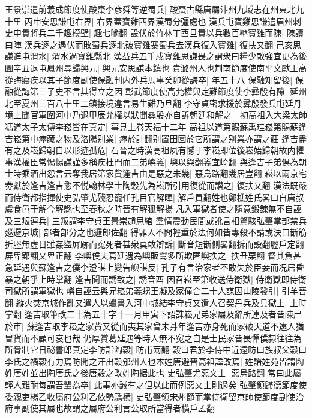 王景崇遣前義成節度使酸棗李彦舜等逆蜀兵|{
	酸棗古縣唐屬汴州九域志在州東北九十里}
丙申安思謙屯右界|{
	右界蓋寶雞西界漢蜀分彊處也}
漢兵屯寶雞思謙遣眉州刺史申貴將兵二千趣模壁|{
	趣七喻翻}
設伏於竹林丁酉旦貴以兵數百壓寶雞而陳|{
	陳讀曰陣}
漢兵逐之遇伏而敗蜀兵逐北破寶雞寨蜀兵去漢兵復入寶雞|{
	復扶又翻}
己亥思謙進屯渭水|{
	渭水過寶雞縣北}
漢益兵五千戍寶雞思謙畏之謂衆曰糧少敵強宜更為後圖辛丑退屯鳳州尋歸興元|{
	興元安思謙本鎮也}
貴潞州人也荆南節度使南平文獻王高從誨寢疾以其子節度副使保融判内外兵馬事癸卯從誨卒|{
	年五十八}
保融知留後|{
	保融從誨第三子史不言其得立之因}
彰武節度使高允權與定難節度使李彞殷有隙|{
	延州北至夏州三百八十里二鎮接境違言易生難乃旦翻}
李守貞密求援於彞殷發兵屯延丹境上聞官軍圍河中乃退甲辰允權以狀聞彞殷亦自訴朝廷和解之　初高祖入大梁太師馮道太子太傅李崧皆在真定|{
	事見上卷天福十二年}
高祖以道第賜蘇禹珪崧第賜蘇逢吉崧第中瘞藏之物及洛陽别業|{
	瘞於計翻别置田園於它所謂之别業亦謂之莊}
逢吉盡有之及崧歸朝自以形迹孤危|{
	石晉之時漢高祖夙有憾于李崧即位後崧始歸朝故内懼}
事漢權臣常惕惕謙謹多稱疾杜門而二弟嶼㠖|{
	嶼以與翻㠖宜崎翻}
與逢吉子弟俱為朝士時乘酒出怨言云奪我居第家貲逢吉由是惡之未幾|{
	惡烏路翻幾居豈翻}
崧以兩京宅劵獻於逢吉逢吉愈不悦翰林學士陶穀先為崧所引用復從而譛之|{
	復扶又翻}
漢法既嚴而侍衛都指揮使史弘肇尤殘忍寵任孔目官解暉|{
	解戶買翻姓也鄭樵姓氏畧曰自唐叔虞食邑于解今解縣也至春秋之時晉有解狐解揚}
凡入軍獄者使之隨意鍛鍊無不自誣及三叛連兵|{
	三叛謂李守貞王景崇趙思綰}
羣情震動民間或訛言相驚駭弘肇掌部禁兵廵邏京城|{
	部者部分之也邏郎佐翻}
得罪人不問輕重於法何如皆專殺不請或決口斮筋折脛無虚日雖姦盜屛跡而寃死者甚衆莫敢辯訴|{
	斷音短斮側畧翻拆而設翻脛戶定翻屏卑郢翻又卑正翻}
李嶼僕夫葛延遇為嶼販鬻多所欺匿嶼抶之|{
	抶丑栗翻}
督其負甚急延遇與蘇逢吉之僕李澄謀上變告嶼謀反|{
	孔子有言治家者不敢失於臣妾而况居昏暴之朝乎上時掌翻}
逢吉聞而誘致之|{
	誘音酉}
因召崧至第收送侍衛獄|{
	侍衛獄即侍衛司獄所謂軍獄也}
嶼自誣云與兄崧弟㠖甥王凝及家僮合二十人謀因山陵發引|{
	引羊晉翻}
縱火焚京城作亂又遣人以蠟書入河中城結李守貞又遣人召契丹兵及具獄上|{
	上時掌翻}
逢吉取筆改二十為五十字十一月甲寅下詔誅崧兄弟家屬及辭所連及者皆陳尸於市|{
	蘇逢吉取李崧之家貲又從而夷其家曾未朞年逢吉亦身死而家破天道不遠人猶冒貨而不顧可哀也哉}
仍厚賞葛延遇等時人無不寃之自是士民家皆畏憚僕隸往往為所脅制它日祕書郎真定李昉詣陶穀|{
	昉甫兩翻}
穀曰君於李侍中近遠昉曰族叔父穀曰李氏之禍穀有力焉昉聞之汗出穀邠州人也本姓唐避晉高祖諱改焉|{
	姓譜姓苑皆謂陶姓唐姓並出陶唐氏之後唐穀之改姓陶据此也}
史弘肇尤惡文士|{
	惡烏路翻}
常曰此屬輕人難耐每謂吾輩為卒|{
	此事亦誠有之但以此而例惡文士則過矣}
弘肇領歸德節度使委親吏楊乙收屬府公利乙依勢驕横|{
	史弘肇領宋州節而掌侍衛留京師使節度副使治府事副使其屬也故謂之屬府公利言公取所當得者横戶孟翻}

